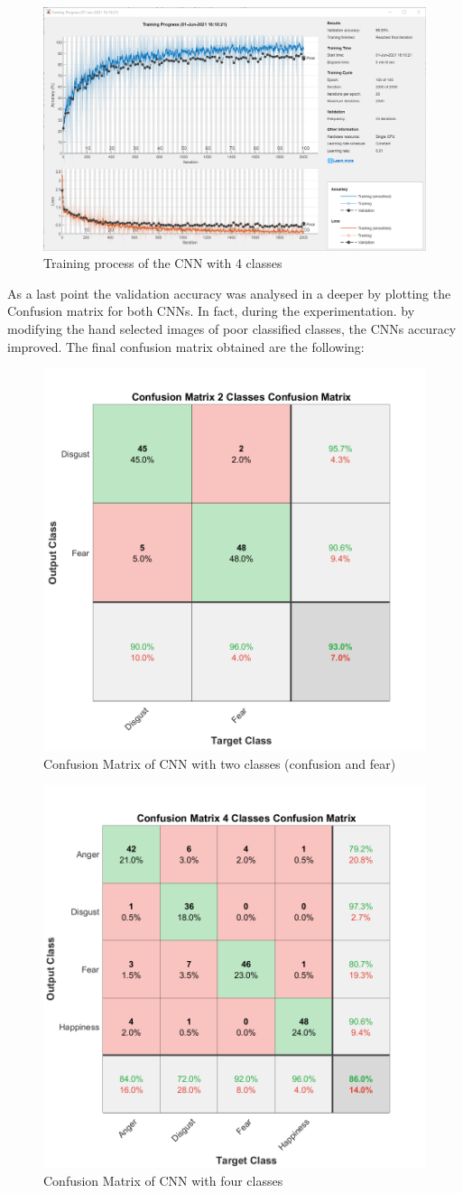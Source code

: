 \begin{figure}[H]
	\centering
	\includegraphics[width=\linewidth]{img/cnn4_training.png}
	\caption{Training process of the CNN with 4 classes}
\end{figure}

As a last point the validation accuracy was analysed in a deeper by plotting the Confusion matrix for both CNNs. In fact, during the experimentation. by modifying the hand selected images of poor classified classes, the CNNs accuracy improved. The final confusion matrix obtained are the following:  
\begin{figure}[H]
	\centering
	\includegraphics[width=0.6\linewidth]{img/digust_x_fear_confusion_matrix.png}
	\caption{Confusion Matrix of CNN with two classes (confusion and fear)}
\end{figure}

\begin{figure}[H]
	\centering
	\includegraphics[width=0.7\linewidth]{img/cnn4_confusion_matrix.png}
	\caption{Confusion Matrix of CNN with four classes}
\end{figure}